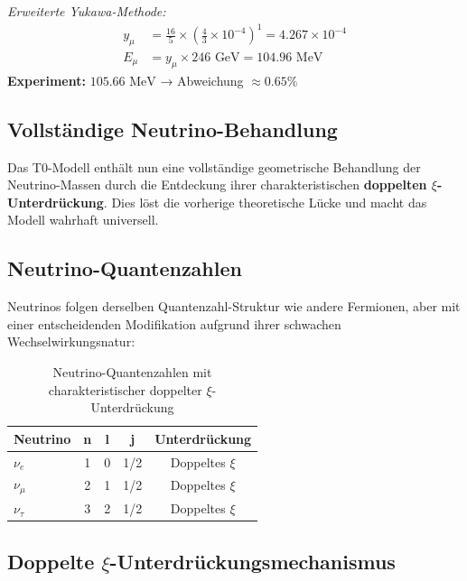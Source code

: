 	\textit{Erweiterte Yukawa-Methode:}
	\begin{align}
		y_\mu &= \frac{16}{5} \times \left(\frac{4}{3} \times 10^{-4}\right)^1 = 4.267 \times 10^{-4} \\
		E_\mu &= y_\mu \times 246 \text{ GeV} = 104.96 \text{ MeV}
	\end{align}
	\textbf{Experiment:} $105.66 \text{ MeV}$ → Abweichung $\approx 0.65\%$
	
	\subsection{Vollständige Neutrino-Behandlung}
	\label{sec:complete_neutrino_treatment}
	
	\begin{neutrino}
		Das T0-Modell enthält nun eine vollständige geometrische Behandlung der Neutrino-Massen durch die Entdeckung ihrer charakteristischen \textbf{doppelten $\xi$-Unterdrückung}. Dies löst die vorherige theoretische Lücke und macht das Modell wahrhaft universell.
	\end{neutrino}
	
	\subsection{Neutrino-Quantenzahlen}
	\label{subsec:neutrino_quantum_numbers}
	
	Neutrinos folgen derselben Quantenzahl-Struktur wie andere Fermionen, aber mit einer entscheidenden Modifikation aufgrund ihrer schwachen Wechselwirkungsnatur:
	
	\begin{table}[H]
		\centering
		\begin{tabular}{lcccc}
			\toprule
			\textbf{Neutrino} & \textbf{n} & \textbf{l} & \textbf{j} & \textbf{Unterdrückung} \\
			\midrule
			$\nu_e$ & 1 & 0 & 1/2 & Doppeltes $\xi$ \\
			$\nu_\mu$ & 2 & 1 & 1/2 & Doppeltes $\xi$ \\
			$\nu_\tau$ & 3 & 2 & 1/2 & Doppeltes $\xi$ \\
			\bottomrule
		\end{tabular}
		\caption{Neutrino-Quantenzahlen mit charakteristischer doppelter $\xi$-Unterdrückung}
		\label{tab:neutrino_quantum_numbers}
	\end{table}
	
	\subsection{Doppelte $\xi$-Unterdrückungsmechanismus}
	\label{subsec:double_xi_suppression}
	
